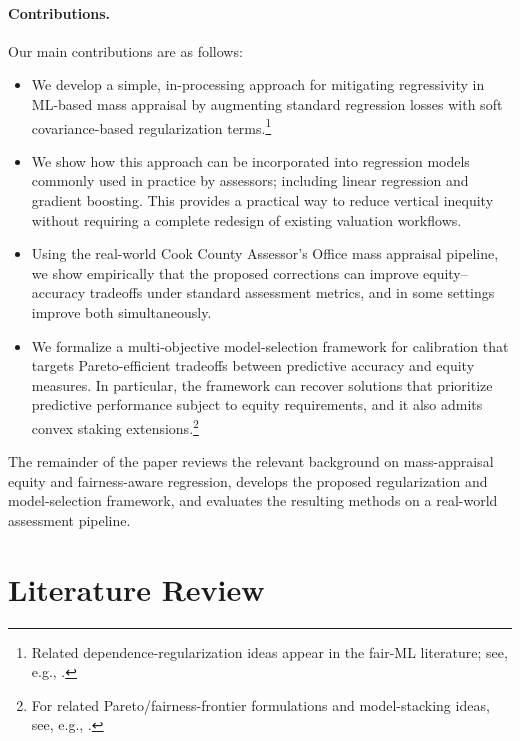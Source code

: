 \documentclass[12pt, draft]{article}
\theoremstyle{plain}
\theoremstyle{definition}
\newcommand{\1}{\mathbf{1}}
\begin{document}
\paragraph{Contributions.} Our main contributions are as follows:
\begin{itemize}
    \item We develop a simple, in-processing approach for mitigating regressivity in ML-based mass appraisal by augmenting standard regression losses with soft covariance-based regularization terms.\footnote{Related dependence-regularization ideas appear in the fair-ML literature; see, e.g., \cite{lee2022maximal,LiEtAl2022Fairness,ScutariPaneroProissl2022}.}

    \item We show how this approach can be incorporated into regression models commonly used in practice by assessors; including linear regression and gradient boosting. This provides a practical way to reduce vertical inequity without requiring a complete redesign of existing valuation workflows.

    \item Using the real-world Cook County Assessor's Office mass appraisal pipeline, we show empirically that the proposed corrections can improve equity--accuracy tradeoffs under standard assessment metrics, and in some settings improve both simultaneously.

    \item We formalize a multi-objective model-selection framework for calibration that targets Pareto-efficient tradeoffs between predictive accuracy and equity measures. In particular, the framework can recover solutions that prioritize predictive performance subject to equity requirements, and it also admits convex staking extensions.\footnote{For related Pareto/fairness-frontier formulations and model-stacking ideas, see, e.g., \cite{martinez2020minimax,little2022fairness}.}
\end{itemize}

The remainder of the paper reviews the relevant background on mass-appraisal equity and fairness-aware regression, develops the proposed regularization and model-selection framework, and evaluates the resulting methods on a real-world assessment pipeline. 

\section{Literature Review}
\end{document}
